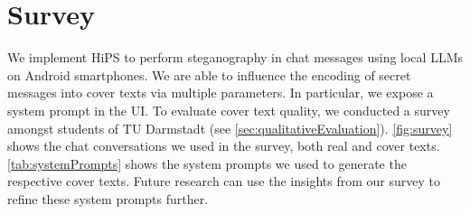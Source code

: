 
\chapter{Survey}\label{ch:survey}
\glsresetall %

We implement \gls{HiPS} to perform steganography in chat messages using local \glspl{LLM} on Android smartphones. We are able to influence the encoding of secret messages into cover texts via multiple parameters. In particular, we expose a system prompt in the \gls{UI}. To evaluate cover text quality, we conducted a survey amongst students of TU Darmstadt (see \cref{sec:qualitativeEvaluation}). \cref{fig:survey} shows the chat conversations we used in the survey, both real and cover texts. \cref{tab:systemPrompts} shows the system prompts we used to generate the respective cover texts. Future research can use the insights from our survey to refine these system prompts further.

